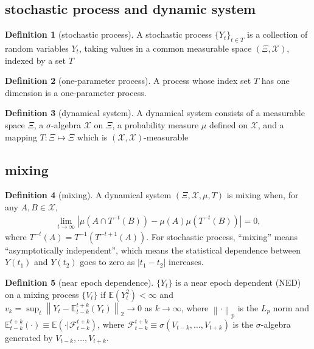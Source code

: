 \documentclass[12pt]{article}
\def\mc#1{\mathcal{#1}} %
\def\E{\mathbb{E}} %
\def\mc#1{\mathcal{#1}}
\newcommand{\norm}[1]{\left\lVert#1\right\rVert} %
\theoremstyle{definition}
\theoremstyle{definition}
\newtheorem{definition}{Definition}
\begin{document}
\subsection{stochastic process and dynamic system}

\begin{definition}[stochastic process]
  A stochastic process $\{Y_t\}_{t\in T}$ is a collection of random variables $Y_t$, taking values in a common measurable space $(\Xi, \mc{X})$, indexed by a set $T$
\end{definition}

\begin{definition}[one-parameter process]
  A  process whose index set $T$ has one dimension is a one-parameter process.
\end{definition}

\begin{definition}[dynamical system]
  A dynamical system  consists of a measurable space $\Xi$, a $\sigma$-algebra $\mc{X}$ on $\Xi$, a probability measure $\mu$ defined on $\mc{X}$, and a mapping $T\colon \Xi \mapsto \Xi$ which is $(\mc{X},\mc{X})$-measurable
\end{definition}

\subsection{mixing}

\begin{definition}[mixing]
  A dynamical system $(\Xi, \mc{X}, \mu, T)$ is mixing when, for any $A,B \in \mc{X}$,
  \begin{align*}
    \lim_{t\to \infty} |\mu(A\cap T^{-t}(B))-\mu(A)\mu(T^{-t}(B))|=0,
  \end{align*}
  where $T^{-t}(A)=T^{-1}(T^{-t+1}(A))$.
  For stochastic process, ``mixing'' means ``asymptotically independent'', which means the statistical dependence between $Y(t_1)$ and $Y(t_2)$ goes to zero as $|t_1-t_2|$ increases.
\end{definition}



\begin{definition}[near epoch dependence]
\label{ned}  $\{Y_t\}$ is a near epoch dependent (NED) on a mixing process $\{V_t\}$ if $\E (Y_t^2) < \infty$ and $v_k= \sup_t \norm{Y_t-\E_{t-k}^{t+k}(Y_t)}_2 \to 0$ as $k \to \infty$, where $\norm{\cdot}_p$ is the $L_p$ norm and $\E_{t-k}^{t+k}(\cdot) \equiv \E (\cdot | \mc{F}_{t-k}^{t+k})$, where $\mc{F}_{t-k}^{t+k}\equiv \sigma(V_{t-k}, \ldots, V_{t+k})$ is the $\sigma$-algebra generated by $V_{t-k}, \ldots, V_{t+k}$.
\end{definition}
\end{document}

